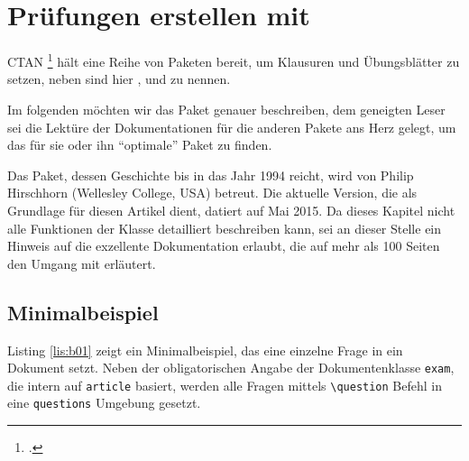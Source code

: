 \chapter[Prüfungen erstellen mit exam]{Prüfungen erstellen mit }


CTAN%
\footcite[Vgl.][]{ziegenhagen:dtk2016/2} 
hält eine Reihe von Paketen bereit, um Klausuren und Übungsblätter zu setzen, neben  sind hier ,  und  zu nennen. 

Im folgenden möchten wir das Paket  genauer beschreiben, dem geneigten Leser sei die Lektüre der Dokumentationen für die anderen Pakete ans Herz gelegt, um das für sie oder ihn \enquote{optimale} Paket zu finden.

Das Paket, dessen Geschichte bis in das Jahr 1994 reicht, wird von Philip Hirschhorn (Wellesley College, USA) betreut. Die aktuelle Version, die als Grundlage für diesen Artikel dient, datiert auf Mai 2015. Da dieses Kapitel nicht alle Funktionen der Klasse detailliert beschreiben kann, sei an dieser Stelle ein Hinweis auf die exzellente Dokumentation erlaubt, die auf mehr als 100 Seiten den Umgang mit  erläutert.

\section{Minimalbeispiel}

Listing \ref{lis:b01} zeigt ein Minimalbeispiel, das eine einzelne Frage in ein Dokument setzt. 
Neben der obligatorischen Angabe der Dokumentenklasse \texttt{exam}, die intern auf \texttt{article} basiert, werden alle Fragen mittels \texttt{\textbackslash question} Befehl in eine \texttt{questions} Umgebung gesetzt. 


